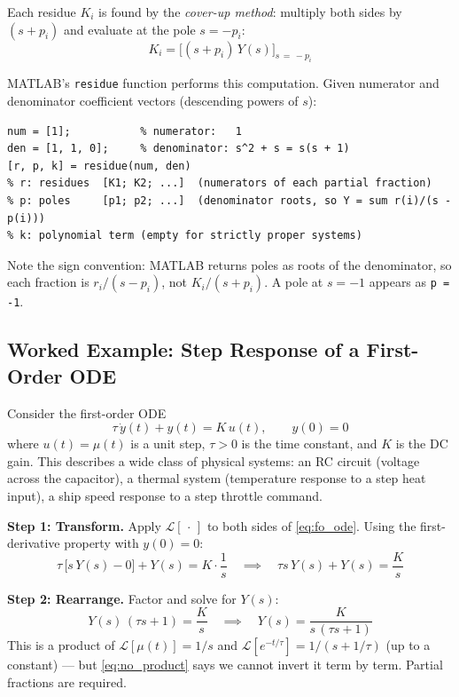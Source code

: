 \documentclass[12pt]{article}
\begin{document}
Each residue $K_i$ is found by the \emph{cover-up method}: multiply both sides
by $(s+p_i)$ and evaluate at the pole $s = -p_i$:
\begin{equation}
  K_i = \bigl[(s+p_i)\,Y(s)\bigr]_{s\,=\,-p_i}
  \label{eq:coverup}
\end{equation}

MATLAB's \texttt{residue} function performs this computation.  Given numerator
and denominator coefficient vectors (descending powers of $s$):
\begin{Verbatim}[frame=single, fontsize=\small]
num = [1];           % numerator:   1
den = [1, 1, 0];     % denominator: s^2 + s = s(s + 1)
[r, p, k] = residue(num, den)
% r: residues  [K1; K2; ...]  (numerators of each partial fraction)
% p: poles     [p1; p2; ...]  (denominator roots, so Y = sum r(i)/(s - p(i)))
% k: polynomial term (empty for strictly proper systems)
\end{Verbatim}

Note the sign convention: MATLAB returns poles as roots of the denominator, so
each fraction is $r_i/(s - p_i)$, not $K_i/(s + p_i)$.  A pole at $s = -1$
appears as \texttt{p = -1}.

\subsection{Worked Example: Step Response of a First-Order ODE}
\label{sec:fo_example}

Consider the first-order ODE
\begin{equation}
  \tau\,\dot{y}(t) + y(t) = K\,u(t), \qquad y(0) = 0
  \label{eq:fo_ode}
\end{equation}
where $u(t) = \mu(t)$ is a unit step, $\tau > 0$ is the time constant, and
$K$ is the DC gain.  This describes a wide class of physical systems: an RC
circuit (voltage across the capacitor), a thermal system (temperature response
to a step heat input), a ship speed response to a step throttle command.

\textbf{Step 1: Transform.}  Apply $\mathcal{L}[\,\cdot\,]$ to both sides of
\cref{eq:fo_ode}.  Using the first-derivative property with $y(0) = 0$:
\[
  \tau\,\bigl[s\,Y(s) - 0\bigr] + Y(s) = K \cdot \frac{1}{s}
  \quad\implies\quad
  \tau s\,Y(s) + Y(s) = \frac{K}{s}
\]

\textbf{Step 2: Rearrange.}  Factor and solve for $Y(s)$:
\[
  Y(s)\,(\tau s + 1) = \frac{K}{s}
  \quad\implies\quad
  Y(s) = \frac{K}{s\,(\tau s + 1)}
\]
This is a product of $\mathcal{L}[\mu(t)] = 1/s$ and $\mathcal{L}[e^{-t/\tau}]
= 1/(s + 1/\tau)$ (up to a constant) --- but \cref{eq:no_product} says we
cannot invert it term by term.  Partial fractions are required.
\end{document}
